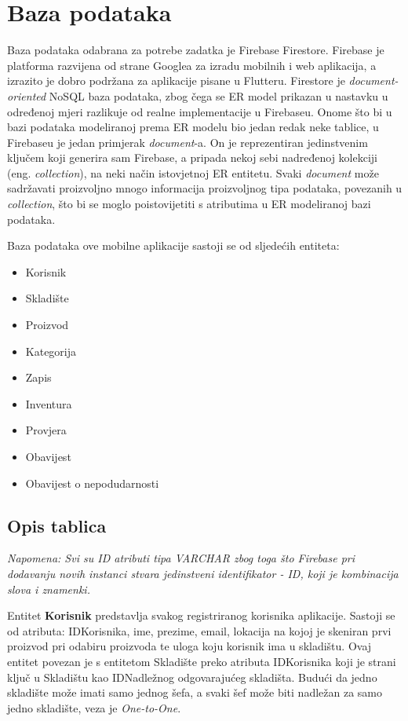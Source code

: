 				
		\section{Baza podataka}

		Baza podataka odabrana za potrebe zadatka je Firebase Firestore. \newline
		Firebase je platforma razvijena od strane Googlea za izradu mobilnih i web aplikacija, a izrazito je dobro podržana za aplikacije pisane u Flutteru. Firestore je \textit{document-oriented} NoSQL baza podataka, zbog čega se ER model prikazan u nastavku u određenoj mjeri razlikuje od realne implementacije u Firebaseu. Onome što bi u bazi podataka modeliranoj prema ER modelu bio jedan redak neke tablice, u Firebaseu je jedan primjerak \textit{document}-a. On je reprezentiran jedinstvenim ključem koji generira sam Firebase, a pripada nekoj sebi nadređenoj kolekciji (eng. \textit{collection}), na neki način istovjetnoj ER entitetu. Svaki \textit{document} može sadržavati proizvoljno mnogo informacija proizvoljnog tipa podataka, povezanih u \textit{collection}, što bi se moglo poistovijetiti s atributima u ER modeliranoj bazi podataka. \newline
		
		Baza podataka ove mobilne aplikacije sastoji se od sljedećih entiteta:
		\begin{itemize}
			\item Korisnik
			\item Skladište
			\item Proizvod
			\item Kategorija
			\item Zapis
			\item Inventura
			\item Provjera
			\item Obavijest
			\item Obavijest o nepodudarnosti
		\end{itemize}
		
			\subsection{Opis tablica}

				 \textit{Napomena: Svi su ID atributi tipa VARCHAR zbog toga što Firebase pri dodavanju novih instanci stvara jedinstveni identifikator - ID, koji je kombinacija slova i znamenki.}
			

				Entitet \textbf{Korisnik} predstavlja svakog registriranog korisnika aplikacije. Sastoji se od atributa: IDKorisnika, ime, prezime, email, lokacija na kojoj je skeniran prvi proizvod pri odabiru proizvoda te uloga koju korisnik ima u skladištu.
				Ovaj entitet povezan je s entitetom Skladište preko atributa IDKorisnika koji je strani ključ u Skladištu kao IDNadležnog odgovarajućeg skladišta. Budući da jedno skladište može imati samo jednog šefa, a svaki šef može biti nadležan za samo jedno skladište, veza je \textit{One-to-One}.
								
